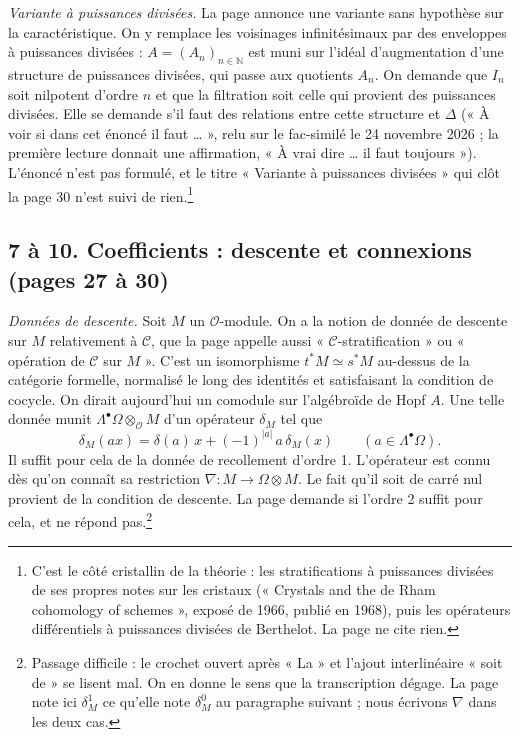 \documentclass[11pt,a4paper]{article}
\begin{document}
\emph{Variante à puissances divisées.} La page annonce une variante sans
hypothèse sur la caractéristique. On y remplace les voisinages infinitésimaux
par des enveloppes à puissances divisées : $A = (A_n)_{n \in \mathbb{N}}$ est
muni sur l'idéal d'augmentation d'une structure de puissances divisées, qui
passe aux quotients $A_n$. On demande que $I_n$ soit nilpotent d'ordre $n$ et
que la filtration soit celle qui provient des puissances divisées. Elle se demande
s'il faut des relations entre cette structure et $\Delta$ (« À voir si dans
cet énoncé il faut … », relu sur le fac-similé le 24 novembre 2026 ; la
première lecture donnait une affirmation, « À vrai dire … il faut toujours »). L'énoncé n'est
pas formulé, et le titre « Variante à puissances divisées » qui clôt la page 30
n'est suivi de rien.\footnote{C'est le côté cristallin de la théorie : les
stratifications à puissances divisées de ses propres notes sur les cristaux
(« Crystals and the de Rham cohomology of schemes », exposé de 1966, publié
en 1968), puis les opérateurs différentiels à puissances divisées de Berthelot.
La page ne cite rien.}

\subsection*{7 à 10. Coefficients : descente et connexions (pages 27 à 30)}

\emph{Données de descente.} Soit $M$ un $\mathcal{O}$-module. On a la notion de
donnée de descente sur $M$ relativement à $\mathcal{C}$, que la page appelle
aussi « $\mathcal{C}$-stratification » ou « opération de $\mathcal{C}$ sur
$M$ ». C'est un isomorphisme $t^{*}M \simeq s^{*}M$ au-dessus de la catégorie
formelle, normalisé le long des identités et satisfaisant la condition de
cocycle. On dirait aujourd'hui un comodule sur l'algébroïde de Hopf $A$. Une
telle donnée munit $\Lambda^{\bullet}\Omega \otimes_{\mathcal{O}} M$ d'un
opérateur $\delta_M$ tel que
\[
\delta_M(a x) = \delta(a)\,x + (-1)^{|a|}\,a\,\delta_M(x)
\qquad (a \in \Lambda^{\bullet}\Omega).
\]
Il suffit pour cela de la donnée de recollement d'ordre 1. L'opérateur est
connu dès qu'on connaît sa restriction $\nabla : M \to \Omega \otimes M$. Le
fait qu'il soit de carré nul provient de la condition de descente. La page
demande si l'ordre 2 suffit pour cela, et ne répond pas.\footnote{Passage
difficile : le crochet ouvert après « La » et l'ajout interlinéaire « soit de »
se lisent mal. On en donne le sens que la transcription dégage. La page note
ici $\delta^{1}_M$ ce qu'elle note $\delta^{0}_M$ au paragraphe suivant ; nous
écrivons $\nabla$ dans les deux cas.}
\end{document}
